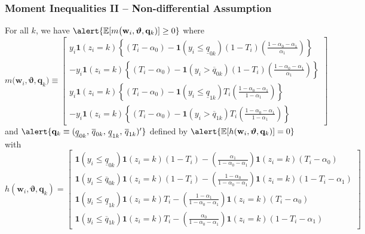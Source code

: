 \documentclass[handout]{beamer}
\begin{document}
\begin{frame}
  \frametitle{Moment Inequalities II -- Non-differential Assumption}

  \scriptsize

  For all $k$, we have $\alert{\mathbb{E}[m\big(\mathbf{w}_i, \boldsymbol{\vartheta}, \mathbf{q}_k)]\geq 0}$ where
\[
  m\big(\mathbf{w}_i, \boldsymbol{\vartheta}, \mathbf{q}_k) \equiv \left[
  \begin{array}{r}
    y_i \mathbf{1}\left( z_i=k \right)\left\{(T_i - \alpha_0) - \mathbf{1}(y_i \leq \underline{q}_{0k})  (1 - T_i)\left( \frac{1 - \alpha_0 - \alpha_1}{\alpha_1} \right)\right\} \\
    - y_i \mathbf{1}(z_i=k) \left\{ (T_i - \alpha_0) -  \mathbf{1}(y_i > \overline{q}_{0k}) (1 - T_i) \left( \frac{1 - \alpha_0 - \alpha_1}{\alpha_1} \right) \right\} \\
    y_i \mathbf{1}\left( z_i=k \right)\left\{(T_i - \alpha_0) - \mathbf{1}(y_i \leq \underline{q}_{1k})  T_i\left( \frac{1 - \alpha_0 - \alpha_1}{1 - \alpha_1} \right)\right\} \\
    - y_i \mathbf{1}(z_i=k) \left\{ (T_i - \alpha_0) -  \mathbf{1}(y_i > \overline{q}_{1k}) T_i \left( \frac{1 - \alpha_0 - \alpha_1}{1 - \alpha_1} \right) \right\} 
\end{array}
\right] 
\]
and $\alert{\mathbf{q}_k \equiv ( \underline{q}_{0k},\, \overline{q}_{0k},\, \underline{q}_{1k}, \,\overline{q}_{1k})'}$ defined by $\alert{\mathbb{E}[h(\mathbf{w}_i,\boldsymbol{\vartheta},\mathbf{q}_k)]=0}$ with
\[
  h(\mathbf{w}_i,\boldsymbol{\vartheta},\mathbf{q}_k) = \left[
  \begin{array}{l}
    \mathbf{1}(y_i \leq \underline{q}_{0k}) \mathbf{1}(z_i=k)(1 - T_i) 
    - \left( \frac{\alpha_1}{1 - \alpha_0 - \alpha_1} \right) \mathbf{1}(z_i=k)(T_i-\alpha_0)\\ 
    \mathbf{1}(y_i \leq \overline{q}_{0k}) \mathbf{1}(z_i=k)(1 - T_i)
    - \left( \frac{1 - \alpha_0}{1 - \alpha_0 - \alpha_1} \right) \mathbf{1}(z_i=k)(1 - T_i-\alpha_1)\\
    \mathbf{1}(y_i \leq \underline{q}_{1k}) \mathbf{1}(z_i=k)T_i
    - \left( \frac{1 - \alpha_1}{1 - \alpha_0 - \alpha_1} \right) \mathbf{1}(z_i=k)(T_i-\alpha_0)\\ 
    \mathbf{1}(y_i \leq \overline{q}_{1k}) \mathbf{1}(z_i=k)T_i 
    - \left( \frac{\alpha_0}{1 - \alpha_0 - \alpha_1} \right) \mathbf{1}(z_i=k)(1 - T_i-\alpha_1)
  \end{array}
\right]
\]

    \hyperlink{INEQ_BODY}{}
\end{frame}
\end{document}

